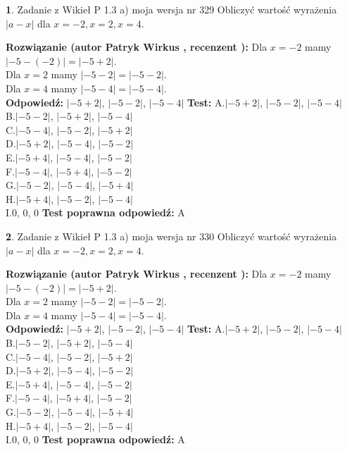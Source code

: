 \documentclass[12pt, a4paper]{article}
\theoremstyle{definition} %
\newtheorem{zad}{}
\newcommand{\zadStart}[1]{\begin{zad}#1\newline}
\newcommand{\zadStop}{\end{zad}}
\newcommand{\rozwStart}[2]{\noindent \textbf{Rozwiązanie (autor #1 , recenzent #2): }\newline}
\newcommand{\rozwStop}{\newline}
\newcommand{\odpStart}{\noindent \textbf{Odpowiedź:}\newline}
\newcommand{\odpStop}{\newline}
\newcommand{\testStart}{\noindent \textbf{Test:}\newline}
\newcommand{\testStop}{\newline}
\newcommand{\kluczStart}{\noindent \textbf{Test poprawna odpowiedź:}\newline}
\newcommand{\kluczStop}{\newline}
\begin{document}
\zadStart{Zadanie z Wikieł P 1.3 a) moja wersja nr 329}
Obliczyć wartość wyrażenia $|a - x|$ dla $x=-2,x=2,x=4$.
\zadStop
\rozwStart{Patryk Wirkus}{}
Dla $x = -2$ mamy $|-5 - (-2)| = |-5 + 2|$.\\
Dla $x = 2$ mamy $|-5 - 2| = |-5 - 2|$.\\
Dla $x = 4$ mamy $|-5 - 4| = |-5 - 4|$.\\
\rozwStop
\odpStart
$|-5 + 2|$, $|-5 - 2|$, $|-5 - 4|$
\odpStop
\testStart
A.$|-5 + 2|$, $|-5 - 2|$, $|-5 - 4|$\\
B.$|-5 - 2|$, $|-5 + 2|$, $|-5 - 4|$\\
C.$|-5 - 4|$, $|-5 - 2|$, $|-5 + 2|$\\
D.$|-5 + 2|$, $|-5 - 4|$, $|-5 - 2|$\\
E.$|-5 + 4|$, $|-5 - 4|$, $|-5 - 2|$\\
F.$|-5 - 4|$, $|-5 + 4|$, $|-5 - 2|$\\
G.$|-5 - 2|$, $|-5 - 4|$, $|-5 + 4|$\\
H.$|-5 + 4|$, $|-5 - 2|$, $|-5 - 4|$\\
I.$0$, $0$, $0$
\testStop
\kluczStart
A
\kluczStop



\zadStart{Zadanie z Wikieł P 1.3 a) moja wersja nr 330}
Obliczyć wartość wyrażenia $|a - x|$ dla $x=-2,x=2,x=4$.
\zadStop
\rozwStart{Patryk Wirkus}{}
Dla $x = -2$ mamy $|-5 - (-2)| = |-5 + 2|$.\\
Dla $x = 2$ mamy $|-5 - 2| = |-5 - 2|$.\\
Dla $x = 4$ mamy $|-5 - 4| = |-5 - 4|$.\\
\rozwStop
\odpStart
$|-5 + 2|$, $|-5 - 2|$, $|-5 - 4|$
\odpStop
\testStart
A.$|-5 + 2|$, $|-5 - 2|$, $|-5 - 4|$\\
B.$|-5 - 2|$, $|-5 + 2|$, $|-5 - 4|$\\
C.$|-5 - 4|$, $|-5 - 2|$, $|-5 + 2|$\\
D.$|-5 + 2|$, $|-5 - 4|$, $|-5 - 2|$\\
E.$|-5 + 4|$, $|-5 - 4|$, $|-5 - 2|$\\
F.$|-5 - 4|$, $|-5 + 4|$, $|-5 - 2|$\\
G.$|-5 - 2|$, $|-5 - 4|$, $|-5 + 4|$\\
H.$|-5 + 4|$, $|-5 - 2|$, $|-5 - 4|$\\
I.$0$, $0$, $0$
\testStop
\kluczStart
A
\kluczStop
\end{document}
